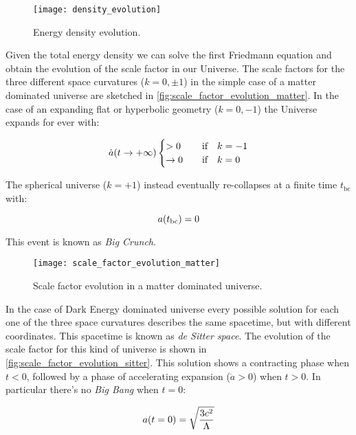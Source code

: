 \begin{figure}
        \centering
        \texttt{[image: density\_evolution]}
        \caption{Energy density evolution.}
        \label{fig:density_evolution}
\end{figure}

Given the total energy density we can solve the first Friedmann equation
and obtain the evolution of the scale factor in our Universe. The scale
factors for the three different space curvatures ($k = 0,\pm 1$) in the
simple case of a matter dominated universe are sketched in
\autoref{fig:scale_factor_evolution_matter}. In the case of an expanding
flat or hyperbolic geometry ($k = 0,-1$) the Universe expands for ever with:

\begin{equation}
        \dot a\qty(t \rightarrow +\infty)
                \begin{cases}
                        > 0 & \qif k = -1 \\
                        \rightarrow 0 & \qif k = 0
                \end{cases}
\end{equation}

The spherical universe ($k = +1$) instead eventually re-collapses at a finite
time $t_{\text{bc}}$ with:

\begin{equation}
        a\qty(t_{\text{bc}}) = 0
\end{equation}

This event is known as \emph{Big Crunch}.

\begin{figure}
        \centering
        \texttt{[image: scale\_factor\_evolution\_matter]}
        \caption{Scale factor evolution in a matter dominated universe.}
        \label{fig:scale_factor_evolution_matter}
\end{figure}

In the case of Dark Energy dominated universe every possible solution for
each one of the three space curvatures describes the same spacetime, but with
different coordinates. This spacetime is known as \emph{de Sitter space}.
The evolution of the scale factor for this kind of universe is shown in
\autoref{fig:scale_factor_evolution_sitter}. This solution shows a
contracting phase when $t < 0$, followed by a phase of accelerating
expansion ($\ddot a > 0$) when $t > 0$. In particular there's no
\emph{Big Bang} when $t = 0$:

\begin{equation}
        a\qty(t = 0) = \sqrt{\frac{3c^2}{\Lambda}}
\end{equation}

